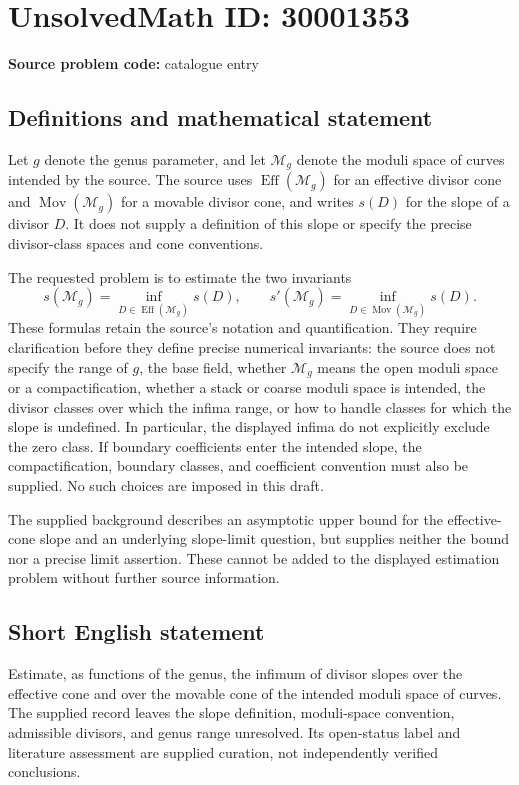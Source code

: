 \documentclass[11pt]{article}
\begin{document}
\section*{UnsolvedMath ID: 30001353}
\textbf{Source problem code:} catalogue entry
\subsection{Definitions and mathematical statement}
Let \(g\) denote the genus parameter, and let \(\mathcal M_g\) denote the moduli space of curves intended by the source. The source uses \(\operatorname{Eff}(\mathcal M_g)\) for an effective divisor cone and \(\operatorname{Mov}(\mathcal M_g)\) for a movable divisor cone, and writes \(s(D)\) for the slope of a divisor \(D\). It does not supply a definition of this slope or specify the precise divisor-class spaces and cone conventions.

The requested problem is to estimate the two invariants
\[
 s(\mathcal M_g)
 =\inf_{D\in\operatorname{Eff}(\mathcal M_g)}s(D),
 \qquad
 s'(\mathcal M_g)
 =\inf_{D\in\operatorname{Mov}(\mathcal M_g)}s(D).
\]
These formulas retain the source's notation and quantification. They require clarification before they define precise numerical invariants: the source does not specify the range of \(g\), the base field, whether \(\mathcal M_g\) means the open moduli space or a compactification, whether a stack or coarse moduli space is intended, the divisor classes over which the infima range, or how to handle classes for which the slope is undefined. In particular, the displayed infima do not explicitly exclude the zero class. If boundary coefficients enter the intended slope, the compactification, boundary classes, and coefficient convention must also be supplied. No such choices are imposed in this draft.

The supplied background describes an asymptotic upper bound for the effective-cone slope and an underlying slope-limit question, but supplies neither the bound nor a precise limit assertion. These cannot be added to the displayed estimation problem without further source information.
\subsection{Short English statement}
Estimate, as functions of the genus, the infimum of divisor slopes over the effective cone and over the movable cone of the intended moduli space of curves. The supplied record leaves the slope definition, moduli-space convention, admissible divisors, and genus range unresolved. Its open-status label and literature assessment are supplied curation, not independently verified conclusions.
\end{document}
